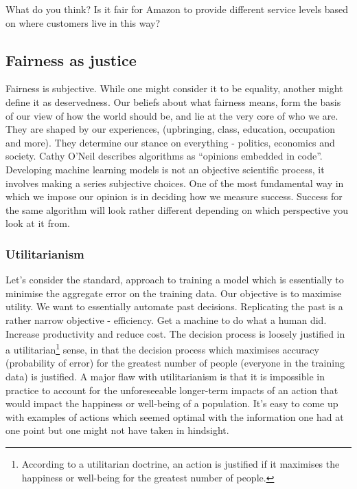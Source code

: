 \begin{lookbox}
What do you think? Is it fair for Amazon to provide different service levels based on where customers live in this way?
\end{lookbox}

\subsection{Fairness as justice} \label{sec_FairnessJustice}

Fairness is subjective. While one might consider it to be equality, another might define it as deservedness. Our beliefs about what fairness means, form the basis of our view of how the world should be, and lie at the very core of who we are. They are shaped by our experiences, (upbringing, class, education, occupation and more). They determine our stance on everything - politics, economics and society. Cathy O’Neil describes algorithms as ``opinions embedded in code''. Developing machine learning models is not an objective scientific process, it involves making a series subjective choices. One of the most fundamental way in which we impose our opinion is in deciding how we measure success. Success for the same algorithm will look rather different depending on which perspective you look at it from.

\subsubsection*{Utilitarianism}

Let's consider the standard, approach to training a model which is essentially to minimise the aggregate error on the training data. Our objective is to maximise utility. We want to essentially automate past decisions. Replicating the past is a rather narrow objective - efficiency.  Get a machine to do what a human did. Increase productivity and reduce cost. The decision process is loosely justified in a utilitarian\footnote{According to a utilitarian doctrine, an action is justified if it maximises the happiness or well-being for the greatest number of people.} sense, in that the decision process which maximises accuracy (probability of error) for the greatest number of people (everyone in the training data) is justified. A major flaw with utilitarianism is that it is impossible in practice to account for the unforeseeable longer-term impacts of an action that would impact the happiness or well-being of a population. It's easy to come up with examples of actions which seemed optimal with the information one had at one point but one might not have taken in hindsight.

